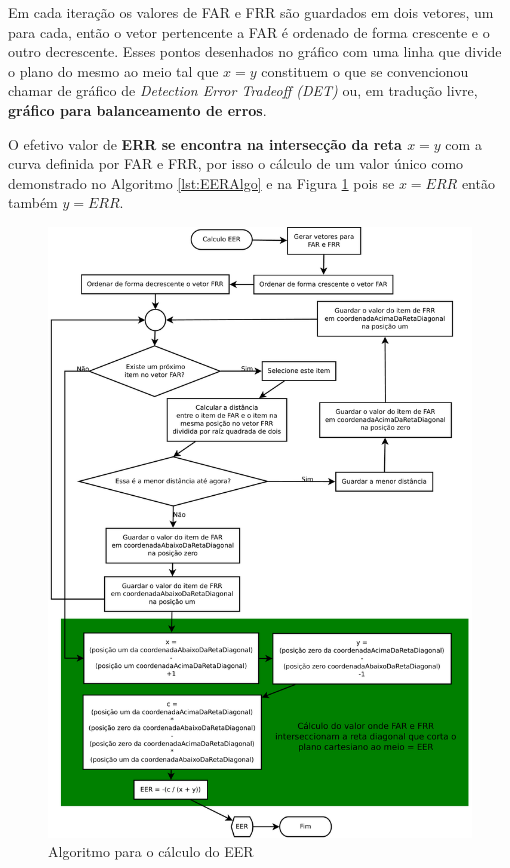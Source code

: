 		\par Em cada iteração os valores de FAR e FRR são guardados em dois vetores, um para cada, então o vetor pertencente a FAR é ordenado de forma crescente e o outro decrescente. Esses pontos desenhados no gráfico com uma linha que divide o plano do mesmo ao meio tal que $x=y$ constituem o que se convencionou chamar de gráfico de \textit{Detection Error Tradeoff (DET)} ou, em tradução livre, \textbf{gráfico para balanceamento de erros}.\\
		
		\par O efetivo valor de \textbf{ERR se encontra na intersecção da reta $x=y$} com a curva definida por FAR e FRR, por isso o cálculo de um valor único como demonstrado no Algoritmo \ref{lst:EERAlgo} e na Figura \ref{fig:eeralgo} pois se $x=ERR$ então também $y=ERR$.\\
	
		

		\begin{figure}[H]
			\centering
			\includegraphics[width=1\linewidth]{images/EERAlgo.pdf}
			\caption{Algoritmo para o cálculo do EER}
			\label{fig:eeralgo}
		\end{figure}
	
